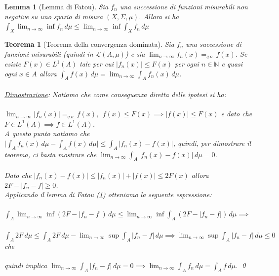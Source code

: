 \documentclass[a4paper,12pt]{report}
\newtheorem{teorema}{Teorema}[chapter]
\newtheorem{lemma}{Lemma}[chapter]
\begin{document}
\vspace{0.5cm}

\begin{lemma}[Lemma di Fatou]\label{app: .1}
    Sia $f_n$ una successione di funzioni misurabili non negative su uno spazio di misura $(X,\Sigma, \mu)$. Allora si ha $\displaystyle\int_X\lim_{n\to\infty}\inf f_n\,d\mu\leq\lim_{n\to\infty}\inf\int_Xf_n\,d\mu$
\end{lemma}

\vspace{0.5cm}

\begin{teorema}[Teorema della convergenza dominata]\label{app: .6}
    Sia $f_n$ una successione di funzioni misurabili (quindi in $\mathcal{L}(A,\mu)$) e sia $\displaystyle\lim_{n\to\infty}f_n(x)=_{q.o.}f(x)$. Se esiste $F(x) \in L^1(A)$ tale per cui $|f_n(x)| \leq F(x)$ per ogni $n\in \mathbb{N}$ e quasi ogni $x\in A$ allora $\displaystyle\int_Af(x)\,d\mu=\lim_{n\to\infty}\int_Af_n(x)\,d\mu$.
    \\
    \\ \underline{Dimostrazione}: Notiamo che come conseguenza diretta delle ipotesi si ha:
    \\
    \\$\displaystyle\lim_{n\to\infty}|f_n(x)|=_{q.o.}f(x), \ \ f(x)\leq F(x)\implies |f(x)|\leq F(x)$ e dato che \mbox{$F \in L^1(A)\implies f\in L^1(A)$.}
    \\ A questo punto notiamo che $\bigg|\displaystyle\int_Af_n(x)\,d\mu-\int_Af(x)\,d\mu\bigg|\leq \int_A|f_n(x)-f(x)|$, quindi, per dimostrare il teorema, ci basta mostrare che $\displaystyle\lim_{n\to\infty}\int_A|f_n(x)-f(x)|\,d\mu=0$.
    \\ 
    \\Dato che $|f_n(x)-f(x)|\leq|f_n(x)|+|f(x)|\leq 2F(x)$ allora $2F-|f_n-f|\geq 0$. \\Applicando il lemma di Fatou (\ref{app: .1}) otteniamo la seguente espressione: 
    \\
    \\$\displaystyle\int_A\lim_{n\to\infty}\inf(2F-|f_n-f|)\,d\mu\leq\lim_{n\to\infty}\inf\int_A(2F-|f_n-f|)\,d\mu \implies $
    \\ 
    \\$\displaystyle\int_A2F\,d\mu\leq \int_A2F\,d\mu-\lim_{n\to\infty}\sup\int_A|f_n-f|\,d\mu\implies \lim_{n\to\infty}\sup\int_A|f_n-f|\,d\mu\leq 0$ che 
    \\
    \\quindi implica $\displaystyle\lim_{n\to\infty}\int_A|f_n-f|\,d\mu=0\implies \lim_{n\to\infty}\int_Af_n\,d\mu=\int_Af\,d\mu$. \qed
\end{teorema}
\end{document}
